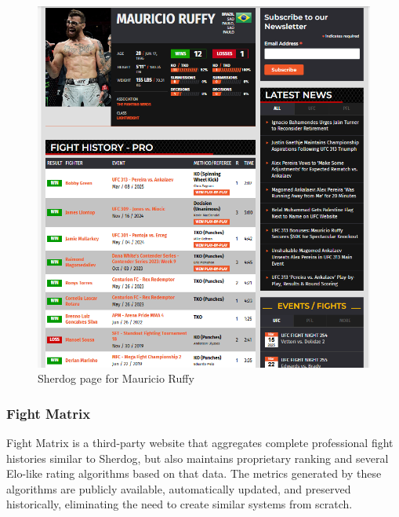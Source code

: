 \documentclass[12pt,twoside]{report}
\begin{document}
\begin{figure}[htb]
    \centering
    \includegraphics[width=0.55\linewidth]{figures/sherdog1.png}
    \caption{Sherdog page for Mauricio Ruffy}
\end{figure}


\subsubsection{Fight Matrix}

Fight Matrix is a third-party website that aggregates complete professional fight histories similar to Sherdog, but also maintains proprietary ranking and several Elo-like rating algorithms based on that data. The metrics generated by these algorithms are publicly available, automatically updated, and preserved historically, eliminating the need to create similar systems from scratch.
\end{document}
